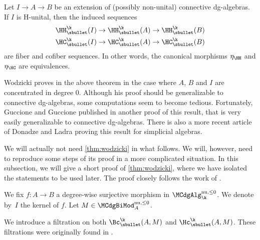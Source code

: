 \begin{thm}[Wodzicki]\label{thm:wodzicki}
Let $I \to A \to B$ be an extension of (possibly non-unital) connective dg-algebras.
If $I$ is H-unital, then the induced sequences
\begin{align*}
\HH_\sbullet^\k(I) &\to \HH_\sbullet^\k(A) \to \HH_\sbullet^\k(B) \\
\HC_\sbullet^\k(I) &\to \HC_\sbullet^\k(A) \to \HC_\sbullet^\k(B)
\end{align*}
are fiber and cofiber sequences. In other words, the canonical morphisms $\eta_\HH$ and $\eta_\HC$ are equivalences.
\end{thm}

Wodzicki proves in \cite{wodzicki:excision} the above theorem in the case where $A$, $B$ and $I$ are concentrated in degree $0$. Although his proof should be generalizable to connective dg-algebras, some computations seem to become tedious. Fortunately, Guccione and Guccione published in \cite{guccioneguccione} another proof of this result, that is very easily generalizable to connective dg-algebras. There is also a more recent article of Donadze and Ladra \cite{DonadzeLadra} proving this result for simplicial algebras.

We will actually not need \autoref{thm:wodzicki} in what follows. We will, however, need to reproduce some steps of its proof in a more complicated situation.
In this subsection, we will give a short proof of \autoref{thm:wodzicki}, where we have isolated the statements to be used later.
The proof closely follows the work of \cite{guccioneguccione}.

We fix $f \colon A \to B$ a degree-wise surjective morphism in $\MCdgAlg_\k^{\mathrm{nu},\leq 0}$. We denote by~$I$ the kernel of $f$. Let $M \in \MCdgBiMod^{\mathrm{nu},\leq 0}_A$.

We introduce a filtration on both $\Bc_\sbullet^\k(A,M)$ and $\Hc_\sbullet^\k(A,M)$. These filtrations were originally found in \cite{guccioneguccione}.
\label{par:filtrationF}

